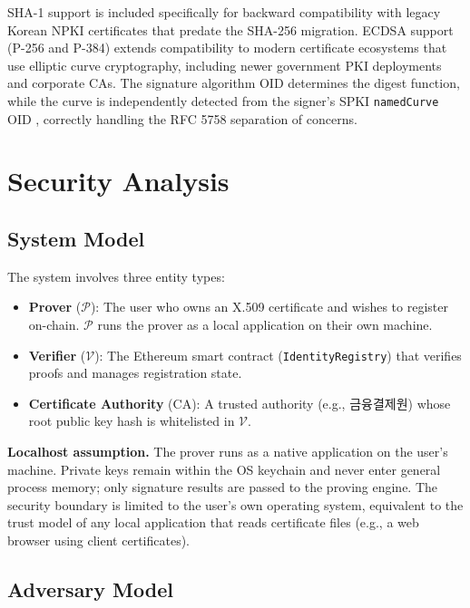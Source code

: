 \documentclass[11pt, a4paper]{article}
\providecommand{\tightlist}{%
  \setlength{\itemsep}{0pt}\setlength{\parskip}{0pt}}
\begin{document}
SHA-1 support is included specifically for backward compatibility with
legacy Korean NPKI certificates that predate the SHA-256 migration.
ECDSA support (P-256 and P-384) extends compatibility to modern
certificate ecosystems that use elliptic curve cryptography, including
newer government PKI deployments and corporate CAs. The signature
algorithm OID determines the digest function, while the curve is
independently detected from the signer's SPKI \texttt{namedCurve} OID
\cite{ref23}, correctly handling the RFC 5758 separation of concerns.


\section{Security Analysis}\label{security-analysis}

\subsection{System Model}\label{system-model}

The system involves three entity types:

\begin{itemize}
\tightlist
\item
  \textbf{Prover} (\(\mathcal{P}\)): The user who owns an X.509
  certificate and wishes to register on-chain. \(\mathcal{P}\) runs the
  prover as a local application on their own machine.
\item
  \textbf{Verifier} (\(\mathcal{V}\)): The Ethereum smart contract
  (\texttt{IdentityRegistry}) that verifies proofs and manages
  registration state.
\item
  \textbf{Certificate Authority} (\(\text{CA}\)): A trusted authority
  (e.g., 금융결제원) whose root public key hash is whitelisted in
  \(\mathcal{V}\).
\end{itemize}

\textbf{Localhost assumption.} The prover runs as a native application on the user's machine. Private keys remain within the OS keychain and never enter general process memory; only signature results are passed to the proving engine. The security boundary is limited
to the user's own operating system, equivalent to the trust model of any
local application that reads certificate files (e.g., a web browser
using client certificates).

\subsection{Adversary Model}\label{adversary-model}
\end{document}
